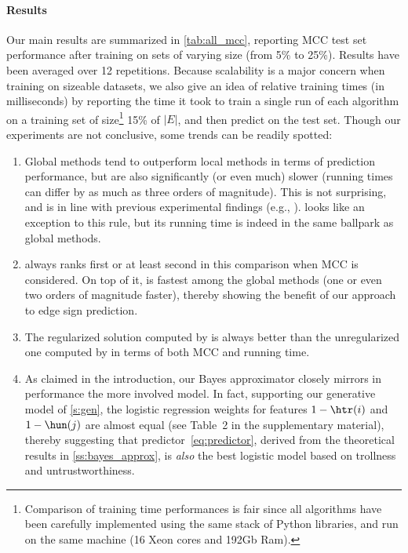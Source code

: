 \paragraph{Results}
Our main results are summarized in \autoref{tab:all_mcc}, reporting MCC test set performance after
training on sets of varying size (from 5\% to 25\%). Results have been averaged over 12 repetitions.
Because scalability is a major concern when training on sizeable datasets, we also give an idea of
relative training times (in milliseconds) by reporting the time it took to train a single run of
each algorithm on a training set of size\footnote{Comparison of training time performances is fair
since all algorithms have been carefully implemented using the same stack of Python libraries, and
run on the same machine (16 Xeon cores and 192Gb Ram).} 15\% of $|E|$, and then predict on the test
set. Though our experiments are not conclusive, some trends can be readily spotted:

\begin{enumerate}[leftmargin=2em,label=\textbf{\arabic*.}]

  \item Global methods tend to outperform local methods in terms of prediction performance, but are
    also significantly (or even much) slower (running times can differ by as much as three orders of
    magnitude). This is not surprising, and is in line with previous experimental findings (e.g.,
    \autocites{shahriari2014ranking}{wu2016troll}). \compbayesian{} looks like an exception to this
    rule, but its running time is indeed in the same ballpark as global methods.

  \item \uslpropGsec{} always ranks first or at least second in this comparison when MCC is
    considered. On top of it, \uslpropGsec{} is fastest among the global methods (one or even two
    orders of magnitude faster), thereby showing the benefit of our approach to edge sign
    prediction.

  \item The regularized solution computed by \uslpropGsec{} is always better than the unregularized
    one computed by \qoptim{} in terms of both MCC and running time.

  \item As claimed in the introduction, our Bayes approximator \usrule{} closely mirrors in
    performance the more involved \uslogregp{} model. In fact, supporting our generative model of
    \autoref{s:gen}, the logistic regression weights for features $1-\htr(i)$ and $1-\hun(j)$
    are almost equal (see Table~2 in the supplementary material), thereby suggesting that
    predictor~\eqref{eq:predictor}, derived from the theoretical results in
    \autoref{ss:bayes_approx}, is \emph{also} the best logistic model based on trollness and
    untrustworthiness.
\end{enumerate}
